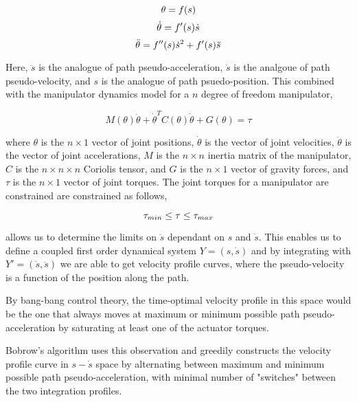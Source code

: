 \documentclass[letterpaper,12pt]{article} %
\begin{document}
\begin{equation}
\theta = f(s)\\
\end{equation}
\begin{equation}
\dot{\theta} = f^\prime(s) \dot{s}\\
\end{equation}
\begin{equation}
\ddot{\theta} = f^{\prime\prime}(s) \dot{s}^2 + f^\prime(s) \ddot{s}\\
\end{equation}


Here, $\ddot{s}$ is the analogue of path pseudo-acceleration, $\dot{s}$ is the analgoue of path pseudo-velocity, and $s$ is the analogue of path psuedo-position. This combined with the manipulator dynamics model for a $n$ degree of freedom manipulator,

\begin{equation}
M({\theta}) \ddot{{\theta}} + \dot{{\theta}}^{T} C({\theta}) \dot{{\theta}} + G({\theta}) = \tau
\end{equation}

where $\theta$ is the $n \times 1$ vector of joint positions, $\dot{\theta}$ is the vector of joint velocities, $\ddot{\theta}$ is the vector of joint accelerations, $M$ is the $n \times n$ inertia matrix of the manipulator, $C$ is the $n \times n \times n$ Coriolis tensor, and $G$ is the $n \times 1$ vector of gravity forces, and $\tau$ is the $n \times 1$ vector of joint torques. The joint torques for a manipulator are constrained are constrained as follows,

\begin{equation}
\tau_{min} \leq \tau \leq \tau_{max} \\
\end{equation}

allows us to determine the limits on $\ddot{s}$ dependant on $s$ and $\dot{s}$. This enables us to define a coupled first order dynamical system $Y = (s, \dot{s})$ and by integrating with $Y' = (\dot{s}, \ddot{s})$ we are able to get velocity profile curves, where the pseudo-velocity is a function of the position along the path.

By bang-bang control theory, the time-optimal velocity profile in this space would be the one that always moves at maximum or minimum possible path pseudo-acceleration by saturating at least one of the actuator torques.

Bobrow's algorithm uses this observation and greedily constructs the velocity profile curve in $s-\dot{s}$ space by alternating between maximum and minimum possible path pseudo-acceleration, with minimal number of "switches" between the two integration profiles.
\end{document}
